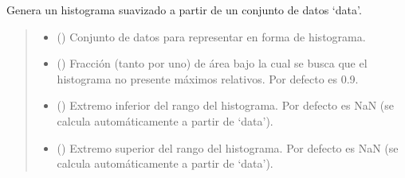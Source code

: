 \documentclass[letterpaper,10pt,english]{sphinxmanual}
\begin{document}

\begin{fulllineitems}
\label{\detokenize{myutils:myutils.stats.get_hist_smooth}}
\pysigstartsignatures
{}
\pysigstopsignatures
\sphinxAtStartPar
Genera un histograma suavizado a partir de un conjunto de datos ‘data’.
\begin{quote}\begin{description}
\begin{itemize}
\item {} 
\sphinxAtStartPar
{} () \textendash{} Conjunto de datos para representar en forma de histograma.

\item {} 
\sphinxAtStartPar
{} (\sphinxstyleliteralemphasis{\sphinxupquote{, }}) \textendash{} Fracción (tanto por uno) de área bajo la cual se busca que el histograma no presente máximos relativos.
Por defecto es 0.9.

\item {} 
\sphinxAtStartPar
{} (\sphinxstyleliteralemphasis{\sphinxupquote{, }}) \textendash{} Extremo inferior del rango del histograma. Por defecto es NaN (se calcula automáticamente a partir de ‘data’).

\item {} 
\sphinxAtStartPar
{} (\sphinxstyleliteralemphasis{\sphinxupquote{, }}) \textendash{} Extremo superior del rango del histograma. Por defecto es NaN (se calcula automáticamente a partir de ‘data’).


\end{itemize}
\end{description}
\end{quote}
\end{fulllineitems}
\end{document}
